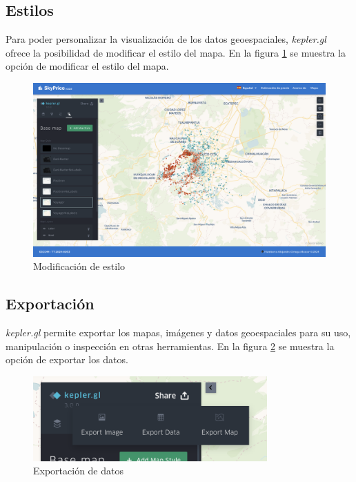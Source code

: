 \subsection{Estilos}
Para poder personalizar la visualización de los datos geoespaciales, \textit{kepler.gl}
ofrece la posibilidad de modificar el estilo del mapa. En la figura \ref{fig:avanzado-estilo}
se muestra la opción de modificar el estilo del mapa.

\begin{figure}[H]
    \centering
    \includegraphics[width=1.0\textwidth]{imagenes/05-mapa-interactivo/avanzado-estilo.png}
    \caption{Modificación de estilo}
    \label{fig:avanzado-estilo}
\end{figure}

\subsection{Exportación}
\textit{kepler.gl} permite exportar los mapas, imágenes y datos geoespaciales
para su uso, manipulación o inspección en otras herramientas. En la figura
\ref{fig:avanzado-exportacion} se muestra la opción de exportar los datos.

\begin{figure}[H]
    \centering
    \includegraphics[width=0.8\textwidth]{imagenes/05-mapa-interactivo/avanzado-exportar.png}
    \caption{Exportación de datos}
    \label{fig:avanzado-exportacion}
\end{figure}

